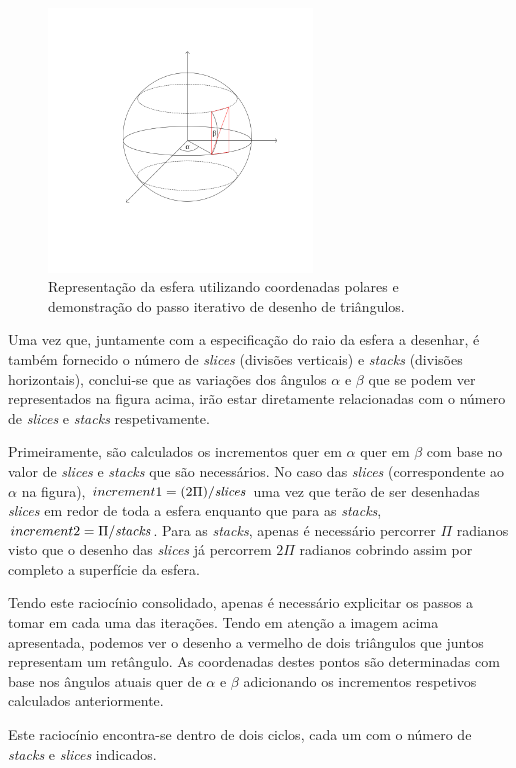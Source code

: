 \documentclass[a4paper]{article}
\begin{document}
\begin{figure}[h!]
\centering
\includegraphics[width=7cm]{./imagens/sphere.png}
\caption{Representação da esfera utilizando coordenadas polares e demonstração do passo iterativo de desenho de triângulos.}
\label{fig:sphere}
\end{figure}

\hspace{3mm} Uma vez que, juntamente com a especificação do raio da esfera a desenhar, é também fornecido o número de \emph{slices} (divisões verticais) e \emph{stacks} (divisões horizontais), conclui-se que as variações dos ângulos $\alpha$ e $\beta$ que se podem ver representados na figura acima, irão estar diretamente relacionadas com o número de \emph{slices} e \emph{stacks} respetivamente.

\hspace{3mm} Primeiramente, são calculados os incrementos quer em $\alpha$ quer em $\beta$ com base no valor de \emph{slices} e \emph{stacks} que são necessários. No caso das \emph{slices} (correspondente ao $\alpha$ na figura), $increment1 = (2\Pi) / \emph{slices}$ uma vez que terão de ser desenhadas \emph{slices} em redor de toda a esfera enquanto que para as \emph{stacks}, $increment2 = \Pi / \emph{stacks}$. Para as \emph{stacks}, apenas é necessário percorrer $\Pi$ radianos visto que o desenho das \emph{slices} já percorrem $2\Pi$ radianos cobrindo assim por completo a superfície da esfera.

\hspace{3mm} Tendo este raciocínio consolidado, apenas é necessário explicitar os passos a tomar em cada uma das iterações. Tendo em atenção a imagem acima apresentada, podemos ver o desenho a vermelho de dois triângulos que juntos representam um retângulo. As coordenadas destes pontos são determinadas com base nos ângulos atuais quer de $\alpha$ e $\beta$ adicionando os incrementos respetivos calculados anteriormente.
\par Este raciocínio encontra-se dentro de dois ciclos, cada um com o número de \emph{stacks} e \emph{slices} indicados.
\end{document}
